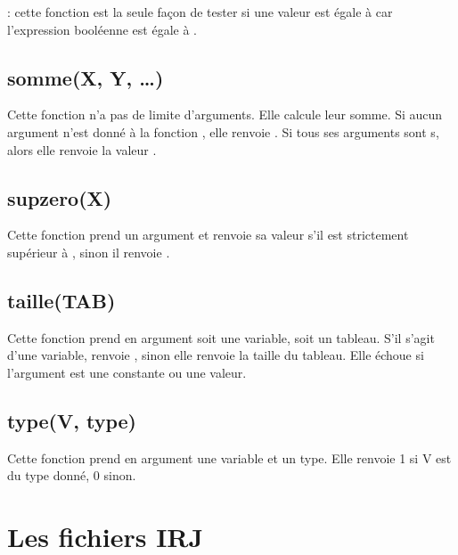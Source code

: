 \documentclass[letterpaper,10pt,french]{sphinxmanual}
\begin{document}
\sphinxAtStartPar
{} : cette fonction est la seule façon de tester si une valeur est
égale à  car l’expression booléenne 
est égale à .


\subsection{somme(X, Y, …)}
\label{\detokenize{fonctions:somme-x-y}}
\sphinxAtStartPar
Cette fonction n’a pas de limite d’arguments.
Elle calcule leur somme.
Si aucun argument n’est donné à la fonction , elle renvoie .
Si tous ses arguments sont s, alors elle renvoie la valeur
.


\subsection{supzero(X)}
\label{\detokenize{fonctions:supzero-x}}
\sphinxAtStartPar
Cette fonction prend un argument  et renvoie sa valeur s’il est strictement supérieur
à , sinon il renvoie .


\subsection{taille(TAB)}
\label{\detokenize{fonctions:taille-tab}}
\sphinxAtStartPar
Cette fonction prend en argument soit une variable, soit un tableau.
S’il s’agit d’une variable,  renvoie , sinon elle renvoie la taille du
tableau.
Elle échoue si l’argument est une constante ou une valeur.


\subsection{type(V, type)}
\label{\detokenize{fonctions:type-v-type}}
\sphinxAtStartPar
Cette fonction prend en argument une variable et un type. Elle
renvoie 1 si V est du type donné, 0 sinon.

\sphinxstepscope


\section{Les fichiers IRJ}
\label{\detokenize{syntax_irj:les-fichiers-irj}}\label{\detokenize{syntax_irj:syntax-irj}}\label{\detokenize{syntax_irj::doc}}
\end{document}
